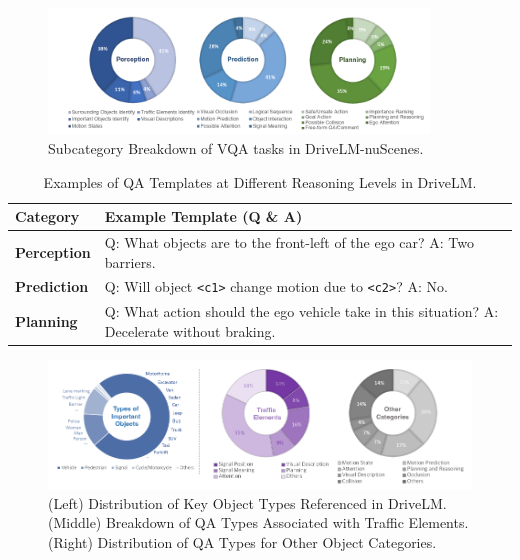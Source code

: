 \documentclass{article} %
\begin{document}
\begin{figure}[H]
    \centering
    \includegraphics[width=0.9\textwidth]{Figures/DriveLM_Dataset_Fig8.png}
    \caption{Subcategory Breakdown of VQA tasks in DriveLM-nuScenes.}
    \label{fig:qa-task-distribution}
\end{figure}

\begin{table}[H]
    \centering
    \small
    \begin{tabularx}{\textwidth}{>{\bfseries}m{2.4cm} X}
        \toprule
        \textbf{Category} & \textbf{Example Template (Q \& A)} \\
        \midrule
        Perception & Q: What objects are to the front-left of the ego car? \newline A: Two barriers. \\
        Prediction & Q: Will object \texttt{<c1>} change motion due to \texttt{<c2>}? \newline A: No. \\
        Planning & Q: What action should the ego vehicle take in this situation? \newline A: Decelerate without braking. \\
        \bottomrule
    \end{tabularx}
    \caption{Examples of QA Templates at Different Reasoning Levels in DriveLM.}
    \label{tab:qa-templates}
\end{table}

\begin{figure}[H]
    \centering
    \includegraphics[width=\textwidth]{Figures/DriveLM_Dataset_Fig9.png}
    \caption{(Left) Distribution of Key Object Types Referenced in DriveLM. (Middle) Breakdown of QA Types Associated with Traffic Elements. (Right) Distribution of QA Types for Other Object Categories.}
    \label{fig:fig9-objects}
\end{figure}
\end{document}
